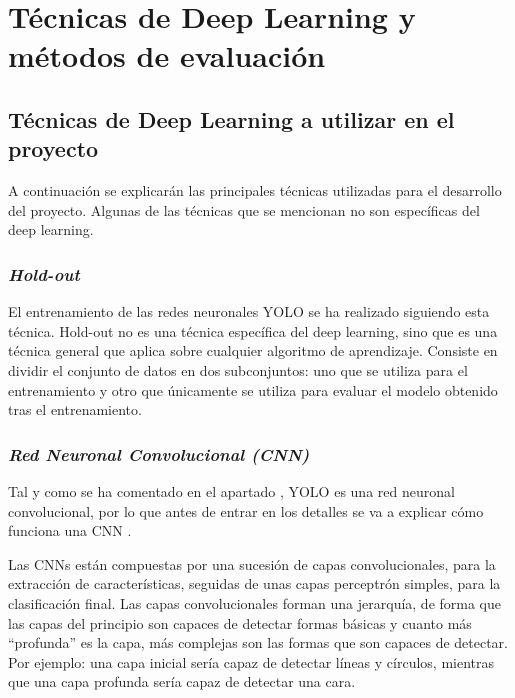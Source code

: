 \section{Técnicas de Deep Learning y métodos de evaluación}
\label{sec:tecnicas_de_deep_learning_y_metodos_de_evaluacion}

\subsection{Técnicas de Deep Learning a utilizar en el proyecto}

A continuación se explicarán las principales técnicas utilizadas para el desarrollo del proyecto. Algunas de las técnicas que se mencionan no son específicas del deep learning.

\subsubsection*{\textit{Hold-out}}

El entrenamiento de las redes neuronales YOLO se ha realizado siguiendo esta técnica. Hold-out no es una técnica específica del deep learning, sino que es una técnica general que aplica sobre cualquier algoritmo de aprendizaje. Consiste en dividir el conjunto de datos en dos subconjuntos: uno que se utiliza para el entrenamiento y otro que únicamente se utiliza para evaluar el modelo obtenido tras el entrenamiento.

\subsubsection*{\textit{Red Neuronal Convolucional (CNN)}}

Tal y como se ha comentado en el apartado \textit{}, YOLO es una red neuronal convolucional, por lo que antes de entrar en los detalles se va a explicar cómo funciona una CNN \cite{s5_cnn1} \cite{s5_cnn2} \cite{s5_cnn3}.

Las CNNs están compuestas por una sucesión de capas convolucionales, para la extracción de características, seguidas de unas capas perceptrón simples, para la clasificación final. Las capas convolucionales forman una jerarquía, de forma que las capas del principio son capaces de detectar formas básicas y cuanto más ``profunda'' es la capa, más complejas son las formas que son capaces de detectar. Por ejemplo: una capa inicial sería capaz de detectar líneas y círculos, mientras que una capa profunda sería capaz de detectar una cara.

